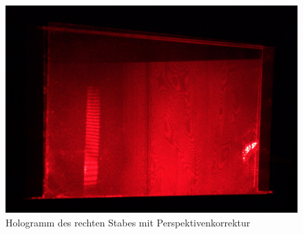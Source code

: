 \begin{figure}[ht]
 \includegraphics[width=\textwidth]{Photos/IMG_3919-korrigiert.jpg}
 \caption{Hologramm des rechten Stabes mit Perspektivenkorrektur}
\end{figure}

